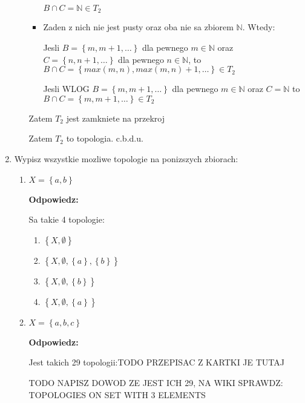 \documentclass{article}
\begin{document}
\begin{enumerate}
\begin{itemize}
\begin{itemize}
$B\cap C = \mathbb{N} \in T_{2}$

\item Zaden z nich nie jest pusty oraz oba nie sa zbiorem $\mathbb{N}$. Wtedy:

Jesli $B = \left\{m, m+1, \dots\right\}$ dla pewnego $m \in \mathbb{N}$ oraz $C =  \left\{n, n+1, \dots\right\}$ dla pewnego $n \in \mathbb{N}$, to $B\cap C = \left\{max(m,n), max(m,n)+1, \dots\right\} \in T_{2}$
\vspace{5mm}

Jesli WLOG $B = \left\{m, m+1, \dots\right\}$ dla pewnego $m \in \mathbb{N}$ oraz $C = \mathbb{N}$ to $B\cap C = \left\{m, m+1, \dots\right\} \in T_{2}$ 
\end{itemize}%
Zatem $T_{2}$ jest zamkniete na przekroj

Zatem $T_{2}$ to topologia. c.b.d.u.
\end{itemize}%

\item Wypisz wszystkie mozliwe topologie na ponizszych zbiorach:

\begin{enumerate}[label=(\alph*)]%
\item $X = \left\{a,b\right\}$

\textbf{Odpowiedz:}

Sa takie 4 topologie:
\begin{enumerate}[label={$T_{\arabic*} = $}]%
    
\item $\left\{X, \emptyset\right\}$
\item $\left\{X, \emptyset, \left\{a\right\}, \left\{b\right\} \right\}$
\item $\left\{X, \emptyset, \left\{b\right\} \right\}$
\item $\left\{X, \emptyset, \left\{a\right\} \right\}$
\end{enumerate}%
 
\item $X = \left\{a,b,c\right\}$   

\textbf{Odpowiedz:}

Jest takich 29 topologii:TODO PRZEPISAC Z KARTKI JE TUTAJ
  
TODO NAPISZ DOWOD ZE JEST ICH 29, NA WIKI SPRAWDZ: TOPOLOGIES ON SET WITH 3 ELEMENTS
\begin{enumerate}[label = {$T_{\arabic*} = $}]%
    

\end{enumerate}
\end{enumerate}
\end{enumerate}
\end{document}
